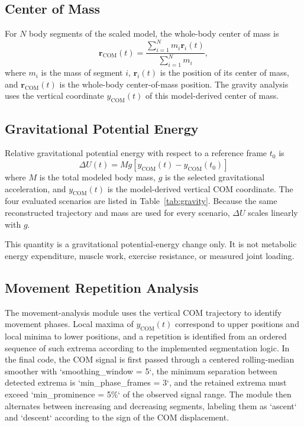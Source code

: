 \documentclass[11pt,a4paper]{article}
\begin{document}
\subsection{Center of Mass}

For $N$ body segments of the scaled model, the whole-body center of mass is
\begin{equation}
\mathbf{r}_{\mathrm{COM}}(t)
=
\frac{\sum_{i=1}^{N}m_i\mathbf{r}_i(t)}
{\sum_{i=1}^{N}m_i},
\label{eq:com}
\end{equation}
where $m_i$ is the mass of segment $i$, $\mathbf{r}_i(t)$ is the position of its center of mass, and $\mathbf{r}_{\mathrm{COM}}(t)$ is the whole-body center-of-mass position. The gravity analysis uses the vertical coordinate $y_{\mathrm{COM}}(t)$ of this model-derived center of mass.

\subsection{Gravitational Potential Energy}

Relative gravitational potential energy with respect to a reference frame $t_0$ is
\begin{equation}
\boxed{\Delta U(t)=Mg\left[y_{\mathrm{COM}}(t)-y_{\mathrm{COM}}(t_0)\right]}
\label{eq:potential}
\end{equation}
where $M$ is the total modeled body mass, $g$ is the selected gravitational acceleration, and $y_{\mathrm{COM}}(t)$ is the model-derived vertical COM coordinate. The four evaluated scenarios are listed in Table~\ref{tab:gravity}. Because the same reconstructed trajectory and mass are used for every scenario, $\Delta U$ scales linearly with $g$.

This quantity is a gravitational potential-energy change only. It is not metabolic energy expenditure, muscle work, exercise resistance, or measured joint loading.

\subsection{Movement Repetition Analysis}

The movement-analysis module uses the vertical COM trajectory to identify movement phases. Local maxima of $y_{\mathrm{COM}}(t)$ correspond to upper positions and local minima to lower positions, and a repetition is identified from an ordered sequence of such extrema according to the implemented segmentation logic. In the final code, the COM signal is first passed through a centered rolling-median smoother with `smoothing_window = 5`, the minimum separation between detected extrema is `min_phase_frames = 3`, and the retained extrema must exceed `min_prominence = 5\%` of the observed signal range. The module then alternates between increasing and decreasing segments, labeling them as `ascent` and `descent` according to the sign of the COM displacement.
\end{document}
